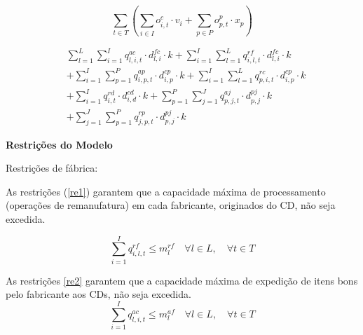 \begin{equation}\label{cmanut}
\sum_{t \in T} \left( \sum_{i \in I} o^{c}_{i,t} \cdot v_{i} + \sum_{p \in P} o^{p}_{p,t} \cdot x_{p} \right)
\end{equation}

\begin{equation}\label{ctransp}
\begin{aligned}
& \sum_{l=1}^{L}\sum_{i=1}^{I} q^{ac}_{l,i,t} \cdot d^{fc}_{l,i} \cdot k + \sum_{i=1}^{I}\sum_{l=1}^{L} q^{rf}_{i,l,t} \cdot d^{fc}_{l,i} \cdot k \\
& + \sum_{i=1}^{I}\sum_{p=1}^{P} q^{ap}_{i,p,t} \cdot d^{cp}_{i,p} \cdot k + \sum_{i=1}^{I}\sum_{l=1}^{L} q^{rc}_{p,i,t} \cdot d^{cp}_{i,p} \cdot k \\
& + \sum_{i=1}^{I}q^{rd}_{i,t} \cdot d^{cd}_{i,d} \cdot k + \sum_{p=1}^{P}\sum_{j=1}^{J} q^{aj}_{p,j,t} \cdot d^{pj}_{p,j} \cdot k \\
& + \sum_{j=1}^{J}\sum_{p=1}^{P} q^{rp}_{j,p,t} \cdot d^{pj}_{p,j} \cdot k
\end{aligned}
\end{equation}

\noindent \textbf{Restrições do Modelo}


\renewcommand{\theequation}{\arabic{chapter}.\arabic{equation}} %

Restrições de fábrica:

As restrições (\ref{re1}) garantem que a capacidade máxima de processamento (operações de remanufatura) em cada fabricante, originados do CD, não seja excedida.

\begin{equation}\label{re1}
\sum_{i=1}^{I} q^{rf}_{i,l,t} \leq m^{rf}_{l} \quad \forall l \in L, \quad \forall t \in T
\end{equation}

As restrições \ref{re2} garantem que a capacidade máxima de expedição de itens bons pelo fabricante aos CDs, não seja excedida.
\begin{equation}\label{re2}
\sum_{i=1}^{I} q^{ac}_{l,i,t} \leq m^{af}_{l} \quad \forall l \in L, \quad \forall t \in T
\end{equation}


